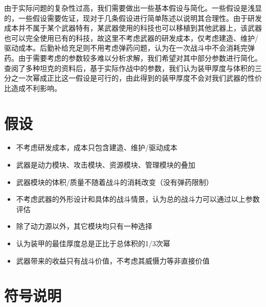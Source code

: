 \documentclass[UTF8]{mcmthesis}
\begin{document}
由于实际问题的复杂性过高，我们需要做出一些基本假设与简化。一些假设是浅显的，一些假设需要佐证，现对于几条假设进行简单陈述以说明其合理性。由于研发成本并不属于某个武器特有，某武器使用的科技也可以移植到其他武器上，该武器也可以完全使用已有的科技，故这里不考虑武器的研发成本，仅考虑建造、维护/驱动成本。后勤补给充足则不用考虑弹药问题，认为在一次战斗中不会消耗完弹药。由于需要考虑的参数较多难以分析求解，我们希望对其中部分参数进行简化。查阅了多种坦克的资料后，基于实际作战中的参数，我们认为装甲厚度与体积的三分之一次幂成正比这一假设是可行的，由此得到的装甲厚度不会对我们武器的性价比造成不利影响。


\section{假设}

\begin{itemize}
\item 不考虑研发成本，成本只包含建造、维护/驱动成本
\item 武器是动力模块、攻击模块、资源模块、管理模块的叠加
\item 武器模块的体积/质量不随着战斗的消耗改变（没有弹药限制）
\item 不考虑武器的外形设计和具体的战斗情景，认为总的战斗力可以通过以上参数评估
\item 除了动力源以外，其它模块均只有一种选择
\item 认为装甲的最佳厚度总是正比于总体积的1/3次幂
\item 武器带来的收益只有战斗价值，不考虑其威慑力等非直接价值
\end{itemize}

\section{符号说明}
\end{document}

